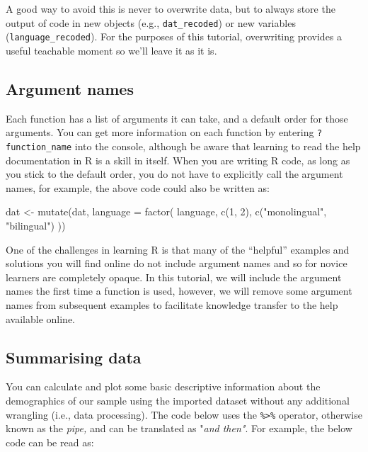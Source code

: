 \documentclass[
  english,
  doc,floatsintext]{apa6}
\newenvironment{Shaded}{\begin{snugshade}}{\end{snugshade}}
\newcommand{\AttributeTok}[1]{\textcolor[rgb]{0.77,0.63,0.00}{#1}}
\newcommand{\DecValTok}[1]{\textcolor[rgb]{0.00,0.00,0.81}{#1}}
\newcommand{\FunctionTok}[1]{\textcolor[rgb]{0.00,0.00,0.00}{#1}}
\newcommand{\NormalTok}[1]{#1}
\newcommand{\OtherTok}[1]{\textcolor[rgb]{0.56,0.35,0.01}{#1}}
\newcommand{\StringTok}[1]{\textcolor[rgb]{0.31,0.60,0.02}{#1}}
\begin{document}
A good way to avoid this is never to overwrite data, but to always store the output of code in new objects (e.g., \texttt{dat\_recoded}) or new variables (\texttt{language\_recoded}). For the purposes of this tutorial, overwriting provides a useful teachable moment so we'll leave it as it is.

\hypertarget{argument-names}{%
\subsection{Argument names}\label{argument-names}}

Each function has a list of arguments it can take, and a default order for those arguments. You can get more information on each function by entering \texttt{?function\_name} into the console, although be aware that learning to read the help documentation in R is a skill in itself. When you are writing R code, as long as you stick to the default order, you do not have to explicitly call the argument names, for example, the above code could also be written as:

\begin{Shaded}
\begin{Highlighting}[]
\NormalTok{dat }\OtherTok{\textless{}{-}} \FunctionTok{mutate}\NormalTok{(dat, }\AttributeTok{language =} \FunctionTok{factor}\NormalTok{(}
\NormalTok{  language,}
  \FunctionTok{c}\NormalTok{(}\DecValTok{1}\NormalTok{, }\DecValTok{2}\NormalTok{),}
  \FunctionTok{c}\NormalTok{(}\StringTok{"monolingual"}\NormalTok{, }\StringTok{"bilingual"}\NormalTok{)}
\NormalTok{))}
\end{Highlighting}
\end{Shaded}

One of the challenges in learning R is that many of the ``helpful'' examples and solutions you will find online do not include argument names and so for novice learners are completely opaque. In this tutorial, we will include the argument names the first time a function is used, however, we will remove some argument names from subsequent examples to facilitate knowledge transfer to the help available online.

\hypertarget{summarising-data}{%
\subsection{Summarising data}\label{summarising-data}}

You can calculate and plot some basic descriptive information about the demographics of our sample using the imported dataset without any additional wrangling (i.e., data processing). The code below uses the \texttt{\%\textgreater{}\%} operator, otherwise known as the \emph{pipe,} and can be translated as "\emph{and then"}. For example, the below code can be read as:
\end{document}
